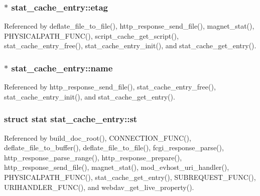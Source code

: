 \hypertarget{structstat__cache__entry_abe2703eb4d75aa483b12133ca4f608ea}{
\subsubsection[{etag}]{$\ast$ stat\-\_\-cache\-\_\-entry\-::etag}}\label{structstat__cache__entry_abe2703eb4d75aa483b12133ca4f608ea}


Referenced by deflate\-\_\-file\-\_\-to\-\_\-file(), http\-\_\-response\-\_\-send\-\_\-file(), magnet\-\_\-stat(), P\-H\-Y\-S\-I\-C\-A\-L\-P\-A\-T\-H\-\_\-\-F\-U\-N\-C(), script\-\_\-cache\-\_\-get\-\_\-script(), stat\-\_\-cache\-\_\-entry\-\_\-free(), stat\-\_\-cache\-\_\-entry\-\_\-init(), and stat\-\_\-cache\-\_\-get\-\_\-entry().

\hypertarget{structstat__cache__entry_afbc3b1fcadd4ac484e039c742dd29c83}{
\subsubsection[{name}]{$\ast$ stat\-\_\-cache\-\_\-entry\-::name}}\label{structstat__cache__entry_afbc3b1fcadd4ac484e039c742dd29c83}


Referenced by http\-\_\-response\-\_\-send\-\_\-file(), stat\-\_\-cache\-\_\-entry\-\_\-free(), stat\-\_\-cache\-\_\-entry\-\_\-init(), and stat\-\_\-cache\-\_\-get\-\_\-entry().

\hypertarget{structstat__cache__entry_a6a8f35128e25cbae3f682e5481894037}{
\subsubsection[{st}]{\setlength{\rightskip}{0pt plus 5cm}struct stat stat\-\_\-cache\-\_\-entry\-::st}}\label{structstat__cache__entry_a6a8f35128e25cbae3f682e5481894037}


Referenced by build\-\_\-doc\-\_\-root(), C\-O\-N\-N\-E\-C\-T\-I\-O\-N\-\_\-\-F\-U\-N\-C(), deflate\-\_\-file\-\_\-to\-\_\-buffer(), deflate\-\_\-file\-\_\-to\-\_\-file(), fcgi\-\_\-response\-\_\-parse(), http\-\_\-response\-\_\-parse\-\_\-range(), http\-\_\-response\-\_\-prepare(), http\-\_\-response\-\_\-send\-\_\-file(), magnet\-\_\-stat(), mod\-\_\-evhost\-\_\-uri\-\_\-handler(), P\-H\-Y\-S\-I\-C\-A\-L\-P\-A\-T\-H\-\_\-\-F\-U\-N\-C(), stat\-\_\-cache\-\_\-get\-\_\-entry(), S\-U\-B\-R\-E\-Q\-U\-E\-S\-T\-\_\-\-F\-U\-N\-C(), U\-R\-I\-H\-A\-N\-D\-L\-E\-R\-\_\-\-F\-U\-N\-C(), and webdav\-\_\-get\-\_\-live\-\_\-property().

